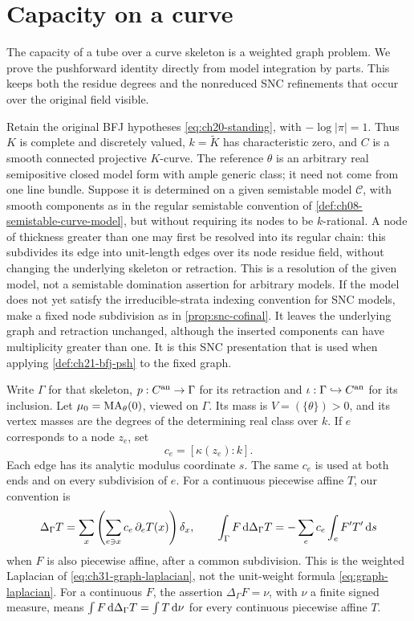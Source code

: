 \section{Capacity on a curve}
\label{sec:ch25-curves}

The capacity of a tube over a curve skeleton is a weighted graph
problem.  We prove the pushforward identity directly from model
integration by parts.  This keeps both the residue degrees and the
nonreduced SNC refinements that occur over the original field visible.

Retain the original BFJ hypotheses \eqref{eq:ch20-standing}, with
\(-\log|\pi|=1\).  Thus \(K\) is complete and discretely valued,
\(k=\widetilde K\) has characteristic zero, and \(C\) is a smooth
connected projective \(K\)-curve.  The reference \(\theta\) is an
arbitrary real semipositive closed model form with ample generic class;
it need not come from one line bundle.  Suppose it is determined on
a given semistable model \(\mathcal C\), with smooth components as in
the regular semistable convention of
\cref{def:ch08-semistable-curve-model}, but without requiring its nodes
to be \(k\)-rational.  A node of thickness greater than one may first
be resolved into its regular chain: this subdivides its edge into
unit-length edges over its node residue field, without changing the
underlying skeleton or retraction.  This is a resolution of the given
model, not a semistable domination assertion for arbitrary models.
If the model does not yet satisfy the irreducible-strata indexing
convention for SNC models, make a fixed node subdivision as in
\cref{prop:snc-cofinal}.  It leaves the underlying graph and
retraction unchanged, although the inserted components can have
multiplicity greater than one.  It is this SNC presentation that
is used when applying \cref{def:ch21-bfj-psh} to the fixed graph.

Write \(\Gamma\) for that skeleton,
\(p:C^{\mathrm{an}}\to\Gamma\) for its retraction and
\(\iota:\Gamma\hookrightarrow C^{\mathrm{an}}\) for its inclusion.  Let
\(\mu_0=\operatorname{MA}_\theta(0)\), viewed on \(\Gamma\).  Its mass is
\(V=(\{\theta\})>0\), and its vertex masses are the degrees of the
determining real class over \(k\).  If \(e\) corresponds to a node
\(z_e\), set
\[
 c_e=[\kappa(z_e):k].
\]
Each edge has its analytic modulus coordinate \(s\).  The same
\(c_e\) is used at both ends and on every subdivision of \(e\).
For a continuous piecewise affine \(T\), our convention is
\[
 \Delta_\Gamma T
 =\sum_x\left(\sum_{e\ni x}c_e\,\partial_eT(x)\right)\delta_x,
 \qquad
 \int_\Gamma F\,\mathrm d\Delta_\Gamma T
 =-\sum_e c_e\int_e F'T'\,\mathrm d s
\]
when \(F\) is also piecewise affine, after a common subdivision.
This is the weighted Laplacian of
\eqref{eq:ch31-graph-laplacian}, not the unit-weight formula
\eqref{eq:graph-laplacian}.  For a continuous \(F\), the assertion
\(\Delta_\Gamma F=\nu\), with \(\nu\) a finite signed measure, means
\(\int F\,\mathrm d\Delta_\Gamma T=\int T\,\mathrm d\nu\) for every continuous
piecewise affine \(T\).

